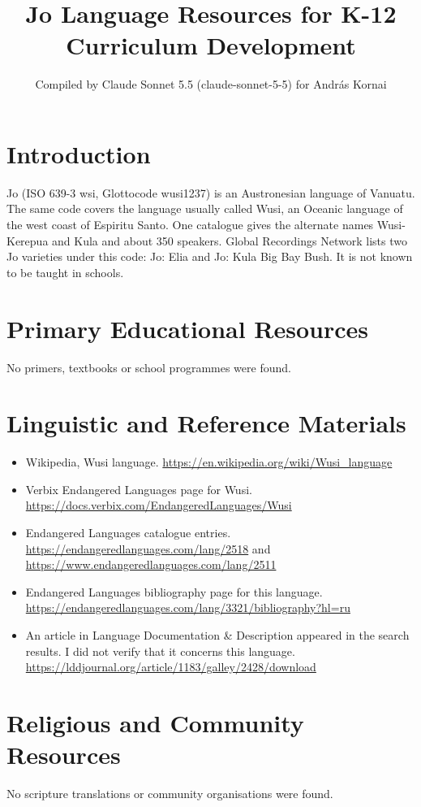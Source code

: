 \documentclass[12pt]{article}
\title{Jo Language Resources for K-12 Curriculum Development}
\author{Compiled by Claude Sonnet 5.5 (claude-sonnet-5-5) for Andr\'as Kornai}
\date{}
\begin{document}
\maketitle

\section{Introduction}
Jo (ISO 639-3 wsi, Glottocode wusi1237) is an Austronesian language of Vanuatu. The same code covers the language usually called Wusi, an Oceanic language of the west coast of Espiritu Santo. One catalogue gives the alternate names Wusi-Kerepua and Kula and about 350 speakers. Global Recordings Network lists two Jo varieties under this code: Jo: Elia and Jo: Kula Big Bay Bush. It is not known to be taught in schools.

\section{Primary Educational Resources}
No primers, textbooks or school programmes were found.

\section{Linguistic and Reference Materials}
\begin{itemize}
\item Wikipedia, Wusi language. \url{https://en.wikipedia.org/wiki/Wusi_language}
\item Verbix Endangered Languages page for Wusi. \url{https://docs.verbix.com/EndangeredLanguages/Wusi}
\item Endangered Languages catalogue entries. \url{https://endangeredlanguages.com/lang/2518} and \url{https://www.endangeredlanguages.com/lang/2511}
\item Endangered Languages bibliography page for this language. \url{https://endangeredlanguages.com/lang/3321/bibliography?hl=ru}
\item An article in Language Documentation \& Description appeared in the search results. I did not verify that it concerns this language. \url{https://lddjournal.org/article/1183/galley/2428/download}
\end{itemize}

\section{Religious and Community Resources}
No scripture translations or community organisations were found.
\end{document}

